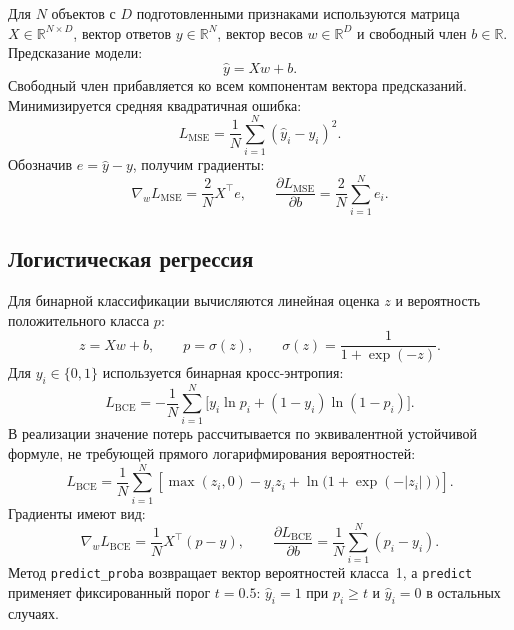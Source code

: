 \documentclass[a4paper,12pt]{article}
\newcommand{\code}[1]{\texttt{#1}}
\newcommand{\R}{\mathbb{R}}
\begin{document}
Для $N$ объектов с $D$ подготовленными признаками используются матрица
$X\in\R^{N\times D}$, вектор ответов $y\in\R^N$, вектор весов
$w\in\R^D$ и свободный член $b\in\R$. Предсказание модели:
\begin{equation}
    \hat y=Xw+b.
\end{equation}
Свободный член прибавляется ко всем компонентам вектора предсказаний.
Минимизируется средняя квадратичная ошибка:
\begin{equation}
    L_{\mathrm{MSE}}=\frac{1}{N}\sum_{i=1}^{N}(\hat y_i-y_i)^2.
\end{equation}
Обозначив $e=\hat y-y$, получим градиенты:
\begin{equation}
    \nabla_w L_{\mathrm{MSE}}=\frac{2}{N}X^\top e,
    \qquad
    \frac{\partial L_{\mathrm{MSE}}}{\partial b}
    =\frac{2}{N}\sum_{i=1}^{N} e_i.
\end{equation}

\subsection{Логистическая регрессия}

Для бинарной классификации вычисляются линейная оценка $z$ и вероятность
положительного класса $p$:
\begin{equation}
    z=Xw+b,\qquad p=\sigma(z),\qquad
    \sigma(z)=\frac{1}{1+\exp(-z)}.
\end{equation}
Для $y_i\in\{0,1\}$ используется бинарная кросс-энтропия:
\begin{equation}
    L_{\mathrm{BCE}}
    =-\frac{1}{N}\sum_{i=1}^{N}
    \bigl[y_i\ln p_i+(1-y_i)\ln(1-p_i)\bigr].
\end{equation}
В реализации значение потерь рассчитывается по эквивалентной устойчивой
формуле, не требующей прямого логарифмирования вероятностей:
\begin{equation}
    L_{\mathrm{BCE}}
    =\frac{1}{N}\sum_{i=1}^{N}
    \left[\max(z_i,0)-y_i z_i+
    \ln\bigl(1+\exp(-|z_i|)\bigr)\right].
\end{equation}
Градиенты имеют вид:
\begin{equation}
    \nabla_w L_{\mathrm{BCE}}=\frac{1}{N}X^\top(p-y),
    \qquad
    \frac{\partial L_{\mathrm{BCE}}}{\partial b}
    =\frac{1}{N}\sum_{i=1}^{N}(p_i-y_i).
\end{equation}
Метод \code{predict\_proba} возвращает вектор вероятностей класса~1,
а \code{predict} применяет фиксированный порог $t=0.5$:
$\hat y_i=1$ при $p_i\geq t$ и $\hat y_i=0$ в остальных случаях.
\end{document}
